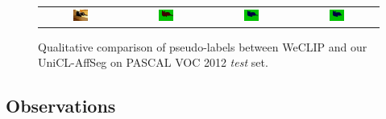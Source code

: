 \begin{figure}[ht]
\begin{tcolorbox}[colframe=black!60, colback=white, boxrule=0.8pt, arc=2pt, left=2pt, right=2pt, top=2pt, bottom=2pt]
\begin{tabular}{cccc}
      
      \includegraphics[width=0.20\textwidth,height=0.20\textwidth]
      {figures/originals/2010_002531}
                &
      \includegraphics[width=0.20\textwidth,height=0.20\textwidth]
      {figures/colored_gts/2010_002531}
                &
      \includegraphics[width=0.20\textwidth,height=0.20\textwidth]
      {figures/test_labels/weclip/2010_002531_[7, 17]}
                &
      \includegraphics[width=0.20\textwidth,height=0.20\textwidth]
      {figures/test_labels/ours/2010_002531_[7, 17]} \\


    \end{tabular}

    \caption{Qualitative comparison of pseudo-labels between WeCLIP and our UniCL-AffSeg on PASCAL VOC 2012 \textit{test} set.}
    \label{fig:qualitative_comparison_pseudolabel_test}
  \end{tcolorbox}
\end{figure}


\subsection{Observations}

